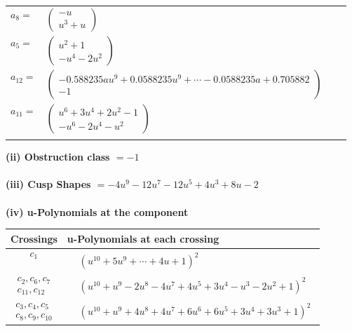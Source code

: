 \documentclass[1p]{elsarticle_modified}
\theoremstyle{definition}
\begin{document}
\begin{tabular}{m{7pt} m{180pt} m{7pt} m{180pt} }
\flushright $a_{8}=$&$\begin{pmatrix}- u\\u^3+u\end{pmatrix}$ \\
\flushright $a_{5}=$&$\begin{pmatrix}u^2+1\\- u^4-2 u^2\end{pmatrix}$ \\
\flushright $a_{12}=$&$\begin{pmatrix}-0.588235 a u^{9}+0.0588235 u^{9}+\cdots-0.0588235 a+0.705882\\-1\end{pmatrix}$ \\
\flushright $a_{11}=$&$\begin{pmatrix}u^6+3 u^4+2 u^2-1\\- u^6-2 u^4- u^2\end{pmatrix}$\\&\end{tabular}
\flushleft \textbf{(ii) Obstruction class $= -1$}\\~\\
\flushleft \textbf{(iii) Cusp Shapes $= -4 u^9-12 u^7-12 u^5+4 u^3+8 u-2$}\\~\\
\newpage\renewcommand{\arraystretch}{1}
\flushleft \textbf{(iv) u-Polynomials at the component}\newline \\
\begin{tabular}{m{50pt}|m{274pt}}
Crossings & \hspace{64pt}u-Polynomials at each crossing \\
\hline $$\begin{aligned}c_{1}\end{aligned}$$&$\begin{aligned}
&(u^{10}+5 u^9+\cdots+4 u+1)^{2}
\end{aligned}$\\
\hline $$\begin{aligned}c_{2},c_{6},c_{7}\\c_{11},c_{12}\end{aligned}$$&$\begin{aligned}
&(u^{10}+u^9-2 u^8-4 u^7+4 u^5+3 u^4- u^3-2 u^2+1)^2
\end{aligned}$\\
\hline $$\begin{aligned}c_{3},c_{4},c_{5}\\c_{8},c_{9},c_{10}\end{aligned}$$&$\begin{aligned}
&(u^{10}+u^9+4 u^8+4 u^7+6 u^6+6 u^5+3 u^4+3 u^3+1)^2
\end{aligned}$\\
\hline
\end{tabular}\\~\\
\end{document}
